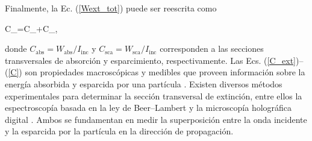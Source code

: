 %
Finalmente, la Ec. (\ref{Wext_tot}) puede ser reescrita como \cite{bohrenAbsorptionScatteringLight2008}
%
\begin{tcolorbox}
	C_{}=C_{}+C_{},
	\label{C} 
\end{tcolorbox}
%
\noindent donde $C_{\text{abs}}=W_{\text{abs}}/I_{\text{inc}}$ y $C_{\text{sca}}=W_{\text{sca}}/I_{\text{inc}}$ corresponden a las secciones transversales de absorción y esparcimiento, respectivamente.
Las Ecs. (\ref{C_ext})–(\ref{C}) son propiedades macroscópicas y medibles que proveen información sobre la energía absorbida y esparcida por una partícula \cite{bohrenAbsorptionScatteringLight2008}. Existen diversos métodos experimentales para determinar la sección transversal de extinción, entre ellos la espectroscopía basada en la ley de Beer–Lambert \cite{bohrenAbsorptionScatteringLight2008} y la microscopía holográfica digital \cite{subediMeasurementExtinctionCross2014}. Ambos se fundamentan en medir la superposición entre la onda incidente y la esparcida por la partícula en la dirección de propagación.

